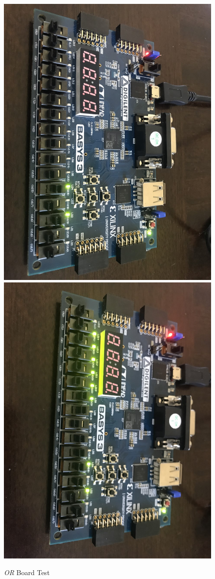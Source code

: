 \documentclass[11pt]{article}
\begin{document}
\begin{figure}[ht]\centering
	\includegraphics[angle=90, width=.8\textwidth]{or1}
	\includegraphics[angle=90, width=.8\textwidth]{or2}
	\caption{\textit{OR} Board Test}
	\label{fig:sim_with_table}
\end{figure}
\end{document}
